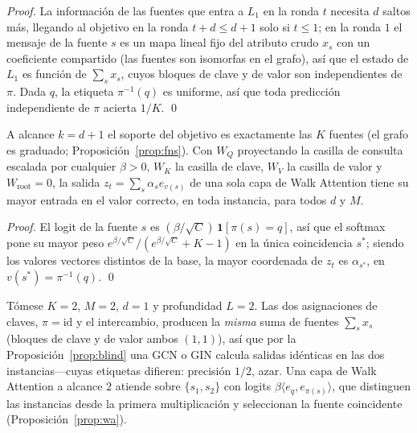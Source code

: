\documentclass[runningheads]{llncs}
\begin{document}
\begin{proof}
La información de las fuentes que entra a $L_1$ en la ronda $t$ necesita $d$
saltos más, llegando al objetivo en la ronda $t+d\le d+1$ solo si $t\le1$; en
la ronda $1$ el mensaje de la fuente $s$ es un mapa lineal fijo del atributo
crudo $x_s$ con un coeficiente compartido (las fuentes son isomorfas en el
grafo), así que el estado de $L_1$ es función de $\sum_s x_s$, cuyos bloques de
clave y de valor son independientes de $\pi$. Dada $q$, la etiqueta
$\pi^{-1}(q)$ es uniforme, así que toda predicción independiente de $\pi$
acierta $1/K$. \qed
\end{proof}

\begin{proposition}\label{prop:wa}
A alcance $k=d+1$ el soporte del objetivo es exactamente las $K$ fuentes (el
grafo es graduado; Proposición~\ref{prop:fns}). Con $W_Q$ proyectando la
casilla de consulta escalada por cualquier $\beta>0$, $W_K$ la casilla de
clave, $W_V$ la casilla de valor y $W_{\!\text{root}}=0$, la salida
$z_t=\sum_s\alpha_s e_{v(s)}$ de una sola capa de Walk Attention tiene su mayor
entrada en el valor correcto, en toda instancia, para todos $d$ y $M$.
\end{proposition}

\begin{proof}
El logit de la fuente $s$ es $(\beta/\sqrt{C})\,\mathbf{1}[\pi(s)=q]$, así que
el softmax pone su mayor peso $e^{\beta/\sqrt{C}}/(e^{\beta/\sqrt{C}}+K-1)$ en
la única coincidencia
$s^\ast$; siendo los valores vectores distintos de la base, la mayor coordenada
de $z_t$ es $\alpha_{s^\ast}$, en $v(s^\ast)=\pi^{-1}(q)$. \qed
\end{proof}

\begin{example}\label{ex:blind}
Tómese $K=2$, $M=2$, $d=1$ y profundidad $L=2$. Las dos asignaciones de claves,
$\pi=\mathrm{id}$ y el intercambio, producen la \emph{misma} suma de fuentes
$\sum_s x_s$ (bloques de clave y de valor ambos $(1,1)$), así que por la
Proposición~\ref{prop:blind} una GCN o GIN calcula salidas idénticas en las dos
instancias---cuyas etiquetas difieren: precisión $1/2$, azar. Una capa de Walk
Attention a alcance $2$ atiende sobre $\{s_1,s_2\}$ con logits
$\beta\langle e_q,e_{\pi(s)}\rangle$, que distinguen las instancias desde la
primera multiplicación y seleccionan la fuente coincidente
(Proposición~\ref{prop:wa}).
\end{example}
\end{document}

